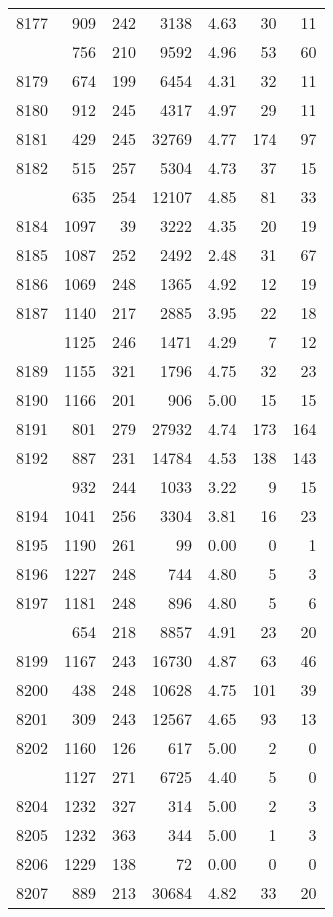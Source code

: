 \documentclass[
]{article}
\begin{document}
\begin{table}
\begin{tabular}[t]{lrrrrrr}
8177 & 909 & 242 & 3138 & 4.63 & 30 & 11\\
\addlinespace
8178 & 756 & 210 & 9592 & 4.96 & 53 & 60\\
8179 & 674 & 199 & 6454 & 4.31 & 32 & 11\\
8180 & 912 & 245 & 4317 & 4.97 & 29 & 11\\
8181 & 429 & 245 & 32769 & 4.77 & 174 & 97\\
8182 & 515 & 257 & 5304 & 4.73 & 37 & 15\\
\addlinespace
8183 & 635 & 254 & 12107 & 4.85 & 81 & 33\\
8184 & 1097 & 39 & 3222 & 4.35 & 20 & 19\\
8185 & 1087 & 252 & 2492 & 2.48 & 31 & 67\\
8186 & 1069 & 248 & 1365 & 4.92 & 12 & 19\\
8187 & 1140 & 217 & 2885 & 3.95 & 22 & 18\\
\addlinespace
8188 & 1125 & 246 & 1471 & 4.29 & 7 & 12\\
8189 & 1155 & 321 & 1796 & 4.75 & 32 & 23\\
8190 & 1166 & 201 & 906 & 5.00 & 15 & 15\\
8191 & 801 & 279 & 27932 & 4.74 & 173 & 164\\
8192 & 887 & 231 & 14784 & 4.53 & 138 & 143\\
\addlinespace
8193 & 932 & 244 & 1033 & 3.22 & 9 & 15\\
8194 & 1041 & 256 & 3304 & 3.81 & 16 & 23\\
8195 & 1190 & 261 & 99 & 0.00 & 0 & 1\\
8196 & 1227 & 248 & 744 & 4.80 & 5 & 3\\
8197 & 1181 & 248 & 896 & 4.80 & 5 & 6\\
\addlinespace
8198 & 654 & 218 & 8857 & 4.91 & 23 & 20\\
8199 & 1167 & 243 & 16730 & 4.87 & 63 & 46\\
8200 & 438 & 248 & 10628 & 4.75 & 101 & 39\\
8201 & 309 & 243 & 12567 & 4.65 & 93 & 13\\
8202 & 1160 & 126 & 617 & 5.00 & 2 & 0\\
\addlinespace
8203 & 1127 & 271 & 6725 & 4.40 & 5 & 0\\
8204 & 1232 & 327 & 314 & 5.00 & 2 & 3\\
8205 & 1232 & 363 & 344 & 5.00 & 1 & 3\\
8206 & 1229 & 138 & 72 & 0.00 & 0 & 0\\
8207 & 889 & 213 & 30684 & 4.82 & 33 & 20\\

\end{tabular}
\end{table}
\end{document}
